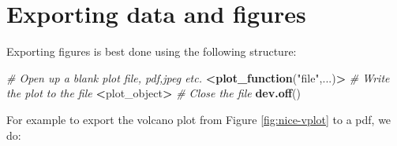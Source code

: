 \documentclass[12pt,]{book}
\newenvironment{Shaded}{\begin{snugshade}}{\end{snugshade}}
\newcommand{\KeywordTok}[1]{\textcolor[rgb]{0.13,0.29,0.53}{\textbf{#1}}}
\newcommand{\StringTok}[1]{\textcolor[rgb]{0.31,0.60,0.02}{#1}}
\newcommand{\CommentTok}[1]{\textcolor[rgb]{0.56,0.35,0.01}{\textit{#1}}}
\newcommand{\OperatorTok}[1]{\textcolor[rgb]{0.81,0.36,0.00}{\textbf{#1}}}
\newcommand{\ErrorTok}[1]{\textcolor[rgb]{0.64,0.00,0.00}{\textbf{#1}}}
\newcommand{\NormalTok}[1]{#1}
\theoremstyle{definition}
\theoremstyle{definition}
\theoremstyle{definition}
\theoremstyle{remark}
\begin{document}
\section{Exporting data and figures}\label{exporting-data-and-figures}

Exporting figures is best done using the following structure:

\begin{Shaded}
\begin{Highlighting}[]
\CommentTok{# Open up a blank plot file, pdf,jpeg etc.}
\OperatorTok{<}\KeywordTok{plot_function}\NormalTok{(}\StringTok{"file"}\NormalTok{,...)}\OperatorTok{>}
\CommentTok{# Write the plot to the file}
\ErrorTok{<}\NormalTok{plot_object}\OperatorTok{>}
\CommentTok{# Close the file}
\KeywordTok{dev.off}\NormalTok{()}
\end{Highlighting}
\end{Shaded}

For example to export the volcano plot from Figure \ref{fig:nice-vplot}
to a pdf, we do:
\end{document}
